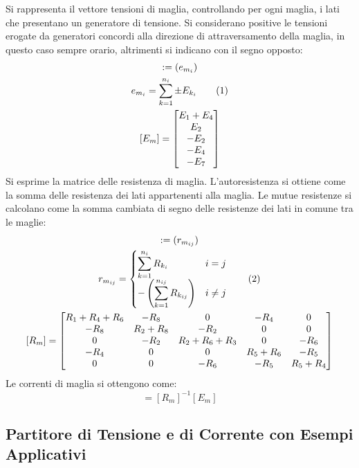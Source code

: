 \documentclass{article}
\newcommand{\tageq}{\tag{\stepcounter{equation}\theequation}}
\numberwithin{equation}{subsection}
\begin{document}
Si rappresenta il vettore tensioni di maglia, controllando per ogni maglia, i lati che presentano un generatore di tensione. Si considerano positive le tensioni erogate 
da generatori concordi alla direzione di attraversamento della maglia, in questo caso sempre orario, altrimenti si indicano con il segno opposto:
\begin{gather*}
    [E_m]:=(e_{m_{i}})\\
    e_{m_i}=\displaystyle\sum_{k=1}^{n_i}\pm E_{k_i}\tageq\\
    [E_m]=\begin{bmatrix}
        E_1+E_4\\
        E_2\\
        -E_2\\
        -E_4\\
        -E_7
    \end{bmatrix}
\end{gather*}
Si esprime la matrice delle resistenza di maglia. L'autoresistenza si ottiene come la somma delle resistenza dei lati appartenenti alla maglia. Le mutue resistenze si calcolano 
come la somma cambiata di segno delle resistenze dei lati in comune tra le maglie:
\begin{gather*}
    [R_m]:=(r_{m_{ij}})\\
    r_{m_{ij}}=\begin{cases}
        \displaystyle\sum_{k=1}^{n_i}R_{k_i}& i=j\\
        \displaystyle-\left(\sum_{k=1}^{n_{ij}}R_{k_{ij}}\right)& i\neq j
    \end{cases}\tageq\\
    [R_m]=\begin{bmatrix}
        R_1+R_4+R_6&-R_8&0&-R_4&0\\
        -R_8&R_2+R_8&-R_2&0&0\\
        0&-R_2&R_2+R_6+R_3&0&-R_6\\
        -R_4&0&0&R_5+R_6&-R_5\\
        0&0&-R_6&-R_5&R_5+R_4
    \end{bmatrix}
\end{gather*}
Le correnti di maglia si ottengono come:
\begin{equation*}
    [I_m]=[R_m]^{-1}[E_m]
\end{equation*}

\subsection{Partitore di Tensione e di Corrente con Esempi Applicativi}
\end{document}
